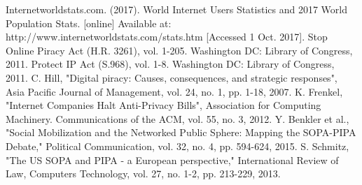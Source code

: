 \documentclass[11pt,journal,compsoc]{IEEEtran}
\begin{document}

%
%
%

\begin{thebibliography}{1}

Internetworldstats.com. (2017). World Internet Users Statistics and 2017 World Population Stats. [online] Available at: 				http://www.internetworldstats.com/stats.htm [Accessed 1 Oct. 2017].
Stop Online Piracy Act (H.R. 3261), vol. 1-205. Washington DC: Library of Congress, 2011.
Protect IP Act (S.968), vol. 1-8. Washington DC: Library of Congress, 2011.
C. Hill, "Digital piracy: Causes, consequences, and strategic responses", Asia Pacific Journal of Management, vol. 24, no. 1, pp. 1-18, 2007.
K. Frenkel, "Internet Companies Halt Anti-Privacy Bills", Association for Computing Machinery. Communications of the ACM, vol. 55, no. 3, 2012.
Y. Benkler et al., "Social Mobilization and the Networked Public Sphere: Mapping the SOPA-PIPA Debate," Political Communication, vol. 32, no. 4, pp. 594-624, 2015. 
S. Schmitz, "The US SOPA and PIPA - a European perspective," International Review of Law, Computers Technology, vol. 27, no. 1-2, pp. 213-229, 2013. 

\end{thebibliography}

% 
\end{document}
